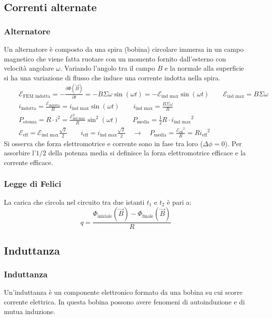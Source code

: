 \documentclass[a4paper]{article}
\begin{document}
\subsection{Correnti alternate}
\subsubsection*{Alternatore}
Un alternatore è composto da una spira (bobina) circolare immersa in un campo magnetico che viene fatta ruotare con un momento
fornito dall'esterno con velocità angolare \(\omega\). Variando l'angolo tra il campo \(B\) e la normale alla superficie si ha
una variazione di flusso che induce una corrente indotta nella spira.
\begin{align*}
	&\quad \mathcal{E}_\text{FEM indotta} = - \frac{\partial \Phi(\vec{B})}{\partial t} = - B \Sigma \omega \sin (\omega t) = - \mathcal{E}_\text{ind max} \sin(\omega t) \qquad \mathcal{E}_\text{ind max} = B \Sigma \omega \\
	&\quad i_\text{indotta} = \frac{\mathcal{E}_\text{indotta}}{R} = i_\text{ind max} \sin(\omega t) \qquad i_\text{ind max} = \frac{B \Sigma \omega}{R} \\
	&\quad P_\text{otenza} = R \cdot i^2 = \frac{\mathcal{E}^2_\text{ind max}}{R} \sin^2 (\omega t) \qquad P_\text{media} = \frac{1}{2} R \cdot {i_\text{ind max}}^2 \\
	&\quad \mathcal{E}_\text{eff} = \mathcal{E}_\text{ind max} \frac{\sqrt{2}}{2} \qquad i_\text{eff} = i_\text{ind max} \frac{\sqrt{2}}{2} \quad \rightarrow \quad P_\text{media} = \frac{{\mathcal{E}_\text{eff}}^2}{R} =  R {i_\text{eff}}^2
\end{align*}
Si osserva che forza elettromotrice e corrente sono in fase tra loro (\(\Delta\phi = 0\)). Per assorbire l'\(1/2\) della potenza
media si definisce la forza elettromotrice efficace e la corrente efficace.

\subsubsection*{Legge di Felici}
La carica che circola nel circuito tra due istanti \(t_1\) e \(t_2\) è pari a:
\[q = \frac{\Phi_\text{iniziale}(\vec{B}) - \Phi_\text{finale}(\vec{B})}{R}\]

\newpage

\subsection{Induttanza}
\subsubsection*{Induttanza}
Un'induttanza è un componente elettronico formato da una bobina su cui scorre corrente elettrica. In questa bobina possono avere
fenomeni di autoinduzione e di mutua induzione.
\end{document}

